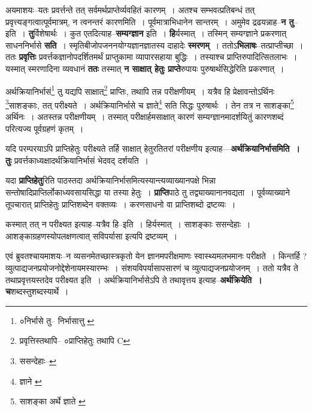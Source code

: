 \documentclass[article,12pt,a4paper]{memoir}
\begin{document}
	  \pstart अयमाशयः--यतः प्रवर्त्तन्ते तत् सर्वमर्थप्राप्तेर्व्यवहितं कारणम् । अतश्च सम्भवत्प्रतिबन्धं तत् प्रवृत्त्यङ्गत्वात्पूर्वमात्रम्, न त्वनन्तरं कारणमिति । पूर्वमात्राभिधानेन सान्तरम् । अमुमेव द्रढयन्नाह--\textbf{न तु}--इति । \textbf{तु}र्विशेषार्थः । कुत एतदित्याह--\textbf{सम्यग्ज्ञान} इति । \textbf{हि}र्यस्मात् । तस्मिन् सम्यग्ज्ञाने प्रकरणात् साधननिर्भासे \textbf{सति} । स्मृतिबीजोपजननयोग्यज्ञानज्ञातस्य दाहादेः \textbf{स्मरणम्} । ततोऽ\textbf{भिलाषः}--तत्प्राप्तीच्छा । ततः \textbf{प्रवृत्तिः} प्रवर्त्तकज्ञानोपदर्शितमर्थं प्राप्तुकामा व्यापारसहाया बुद्धिः । तस्याश्च प्राप्तिरुपादित्सितलाभः । यस्मात् स्मरणादिना व्यवधानं \textbf{ततः} तस्मात् \textbf{न साक्षात् हेतुः प्राप्ते}रुपायः पुरुषार्थसिद्धेरिति प्रकरणात् ।
	\pend
      \leavevmode{}
	  \bigskip
	  \begingroup
	

	  \pstart अर्थक्रियानिर्भासं\footnote{०निर्भासे तु--\cite{dp-msA} \cite{dp-msC} \cite{dp-edP} \cite{dp-edH} \cite{dp-edN} निर्भासात्तु \cite{dp-msB} \cite{dp-edE} \cite{dp-msD}} तु यद्यपि साक्षात्\footnote{प्रवृत्तिस्तथापि--\cite{dp-msA} \cite{dp-edP} \cite{dp-edH} ०प्राप्तिहेतुः तथापि C} प्राप्तिः, तथापि तन्न परीक्षणीयम् । यत्रैव हि प्रेक्षावन्तोऽर्थिनः \footnote{ससन्देहाः--\cite{dp-msD-n}}साशङ्काः, तत् परीक्ष्यते । अर्थक्रियानिर्भासे च ज्ञाते\footnote{ज्ञाने \cite{dp-msB} \cite{dp-edP} \cite{dp-edH}} सति सिद्धः पुरुषार्थः । तेन तत्र न साशङ्का\footnote{साशङ्का अर्थे ज्ञाते \cite{dp-msA} \cite{dp-edP} \cite{dp-edH}} अर्थिनः । अतस्तन्न परीक्षणीयम् । तस्मात् परीक्षार्हमसाक्षात् कारणं सम्यग्ज्ञानमादर्शयितुं कारणशब्दं परित्यज्य पूर्वग्रहणं कृतम् ।
	\pend
      
	  \endgroup
	

	  \pstart यदि परम्परयाऽपि प्राप्तिहेतुः परीक्ष्यते तर्हि साक्षात् हेतुरतितरां परीक्षणीय इत्याह—\textbf{अर्थक्रियानिर्भासमिति । तुः} प्रवर्त्तकाध्यक्षादर्थक्रियानिर्भासं भेदवद् दर्शयति ।
	\pend
      

	  \pstart यदा \textbf{प्राप्तिहेतु}रिति पाठस्तदा अर्थक्रियानिर्भासमित्यस्यान्त्यव्याख्यानपक्षे भिन्ना सन्तोषादिप्राप्तिर्लोकाध्यवसायसिद्धा या तस्या हेतुः । \textbf{प्राप्ति}पाठे तु तद्व्याख्यानानवद्यता । पूर्वव्याख्याने तूपचारात् प्राप्तिहेतुः प्राप्तिशब्देन वक्तव्यः । करणसाधनो वा प्राप्तिशब्दो द्रष्टव्यः ।
	\pend
      

	  \pstart कस्मात् तत् न परीक्ष्यत इत्याह--यत्रैव हि--इति । हिर्यस्मात् । साशङ्काः ससन्देहाः । आशङ्काग्रहणस्योपलक्षणत्वात् सविपर्यासा इत्यपि द्रष्टव्यम् ।
	\pend
      

	  \pstart एवं ब्रुवतश्चायमाशयः--न व्यसनमेतच्छास्त्रकृतो येन ज्ञानमपरीक्षमाणः स्वास्थ्यमलभमानः परीक्षते । किन्तर्हि ? व्युत्पाद्यजनप्रयोजनोद्देशेनायमस्यारम्भः । संशयविपर्यासापसारणं च व्युत्पाद्यजनप्रयोजनम् । ततो यत्रैव ते तथाप्रवृत्तयस्तदेव परीक्ष्यत इति । अर्थक्रियानिर्भासेऽपि ते तथावृत्तय इत्याह--\textbf{अर्थक्रियेति । च}शब्दस्तुशब्दस्यार्थे ।
	\pend
      
\end{document}
